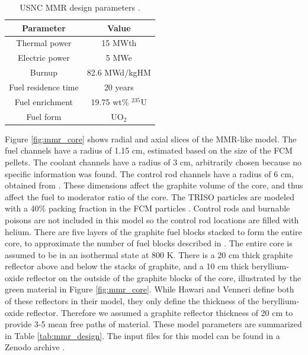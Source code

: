 \begin{table}
    \centering 
    \caption{USNC MMR design parameters \cite{noauthor_usnc_2021}.}
    \label{tab:mmr}
    \begin{tabular}{c c}
        \hline
        Parameter & Value \\
        \hline
        Thermal power & 15 MWth\\
        Electric power & 5 MWe \\
        Burnup & 82.6 MWd/kgHM \\
        Fuel residence time & 20 years\\
        Fuel enrichment & 19.75 wt\% $^{235}$U\\
        Fuel form & UO$_2$\\
        \hline
        
    \end{tabular}
\end{table}

Figure \ref{fig:mmr_core} shows radial and axial slices of the 
\gls*{MMR}-like model. The fuel channels have a radius of 1.15 cm, 
estimated based on the size of the \gls*{FCM} pellets. 
The coolant channels have a radius of 
3 cm, arbitrarily chosen because no specific information was found.
The control rod channels have a radius of 6 cm, obtained from 
\cite{hawari_development_2018}. These dimensions affect the graphite volume 
of the core, and thus affect the fuel to moderator ratio of the core. 
The \gls*{TRISO} particles are modeled with a 40\% packing fraction in 
the \gls*{FCM} particles \cite{powers_fully_2014}.
Control rods and burnable poisons are not included in this 
model so the control rod locations are filled with helium.
There are five layers of the graphite fuel blocks 
stacked to form the entire core, to approximate the number of 
fuel blocks described in \cite{noauthor_usnc_2021}. The entire core 
is assumed to be in an isothermal state at 800 K. There is a 20 cm 
thick graphite reflector above and below the stacks of graphite, 
and a 10 cm thick beryllium-oxide reflector on the outside of the 
graphite blocks of the core, illustrated by the green material in 
Figure \ref{fig:mmr_core}. While Hawari and Venneri \cite{hawari_development_2018}
define both of these reflectors in their model, they only 
define the thickness of the beryllium-oxide reflector. Therefore we 
assumed a graphite reflector thickness of 20 cm to provide 3-5 mean 
free paths of material. These model parameters are summarized in 
Table \ref{tab:mmr_design}. The input files for this model can be found 
in a Zenodo archive 
\cite{bachmann_mmr-like_2023}.

